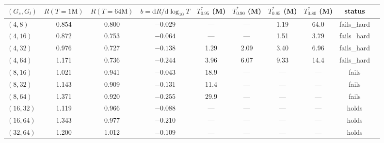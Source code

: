 \begin{center}
\small
\begin{tabular}{lccccccccc}
\toprule
$(G_s, G_l)$ & $R(T{=}1\mathrm{M})$ & $R(T{=}64\mathrm{M})$
             & $b = \mathrm{d}R/\mathrm{d}\log_{10}T$
             & $T^*_{0.95}$ (M) & $T^*_{0.90}$ (M)
             & $T^*_{0.85}$ (M) & $T^*_{0.80}$ (M)
             & status \\
\midrule
$(4,8)$   & 0.854 & 0.800 & $-0.029$ & ---    & ---    & 1.19  & 64.0  & fails\_hard \\
$(4,16)$  & 0.872 & 0.753 & $-0.064$ & ---    & ---    & 1.51  & 3.79  & fails\_hard \\
$(4,32)$  & 0.976 & 0.727 & $-0.138$ & 1.29   & 2.09   & 3.40  & 6.96  & fails\_hard \\
$(4,64)$  & 1.171 & 0.736 & $-0.244$ & 3.96   & 6.07   & 9.33  & 14.4  & fails\_hard \\
$(8,16)$  & 1.021 & 0.941 & $-0.043$ & 18.9   & ---    & ---   & ---   & fails \\
$(8,32)$  & 1.143 & 0.909 & $-0.131$ & 11.4   & ---    & ---   & ---   & fails \\
$(8,64)$  & 1.371 & 0.920 & $-0.255$ & 29.9   & ---    & ---   & ---   & fails \\
$(16,32)$ & 1.119 & 0.966 & $-0.088$ & ---    & ---    & ---   & ---   & holds \\
$(16,64)$ & 1.343 & 0.977 & $-0.210$ & ---    & ---    & ---   & ---   & holds \\
$(32,64)$ & 1.200 & 1.012 & $-0.109$ & ---    & ---    & ---   & ---   & holds \\
\bottomrule
\end{tabular}
\end{center}

